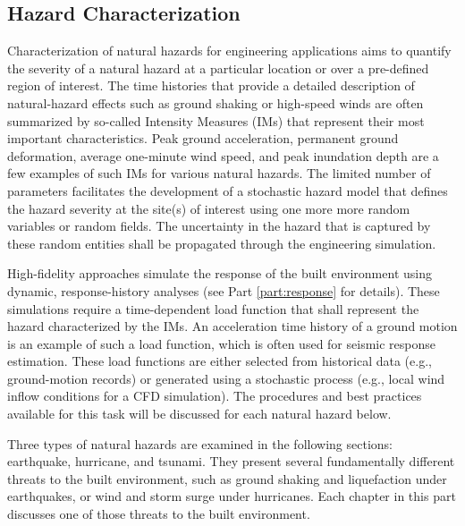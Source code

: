 
\begin{partbacktext}
\part{Hazard Characterization}
\label{part:hazard}

Characterization of natural hazards for engineering applications aims to quantify the severity of a natural hazard at a particular location or over a pre-defined region of interest. The time histories that provide a detailed description of natural-hazard effects such as ground shaking or high-speed winds are often summarized by so-called Intensity Measures (IMs) that represent their most important characteristics. Peak ground acceleration, permanent ground deformation, average one-minute wind speed, and peak inundation depth are a few examples of such IMs for various natural hazards. The limited number of parameters facilitates the development of a stochastic hazard model that defines the hazard severity at the site(s) of interest using one more more random variables or random fields. The uncertainty in the hazard that is captured by these random entities shall be propagated through the engineering simulation. 

High-fidelity approaches simulate the response of the built environment using dynamic, response-history analyses (see Part \ref{part:response} for details). These simulations require a time-dependent load function that shall represent the hazard characterized by the IMs. An acceleration time history of a ground motion is an example of such a load function, which is often used for seismic response estimation. These load functions are either selected from historical data (e.g., ground-motion records) or generated using a stochastic process (e.g., local wind inflow conditions for a CFD simulation). The procedures and best practices available for this task will be discussed for each natural hazard below.

Three types of natural hazards are examined in the following sections: earthquake, hurricane, and tsunami. They present several fundamentally different threats to the built environment, such as ground shaking and liquefaction under earthquakes, or wind and storm surge under hurricanes. Each chapter in this part discusses one of those threats to the built environment.

\end{partbacktext}